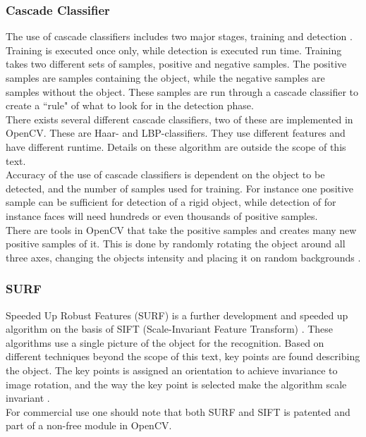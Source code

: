 \subsubsection{Cascade Classifier}
The use of cascade classifiers includes two major stages, training and detection \citep{cascade}. Training is executed once only, while detection is executed run time. Training takes two different sets of samples, positive and negative samples. The positive samples are samples containing the object, while the negative samples are samples without the object. These samples are run through a cascade classifier to create a ``rule" of what to look for in the detection phase.\\\newline
There exists several different cascade classifiers, two of these are implemented in OpenCV. These are Haar- and LBP-classifiers. They use different features and have different runtime. Details on these algorithm are outside the scope of this text.\\
\newline
Accuracy of the use of cascade classifiers is dependent on the object to be detected, and the number of samples used for training. For instance one positive sample can be sufficient for detection of a rigid object, while detection of for instance faces will need hundreds or even thousands of positive samples.\\\newline
There are tools in OpenCV that take the positive samples and creates many new positive samples of it. This is done by randomly rotating the object around all three axes, changing the objects intensity and placing it on random backgrounds \citep{cascade}.
\subsubsection{SURF}
Speeded Up Robust Features (SURF) is a further development and speeded up algorithm on the basis of SIFT (Scale-Invariant Feature Transform) \citep{surf}. These algorithms use a single picture of the object for the recognition. Based on different techniques beyond the scope of this text, key points are found describing the object. The key points is assigned an orientation to achieve invariance to image rotation, and the way the key point is selected make the algorithm scale invariant \citep{sift}.\\\newline
For commercial use one should note that both SURF and SIFT is patented and part of a non-free module in OpenCV.